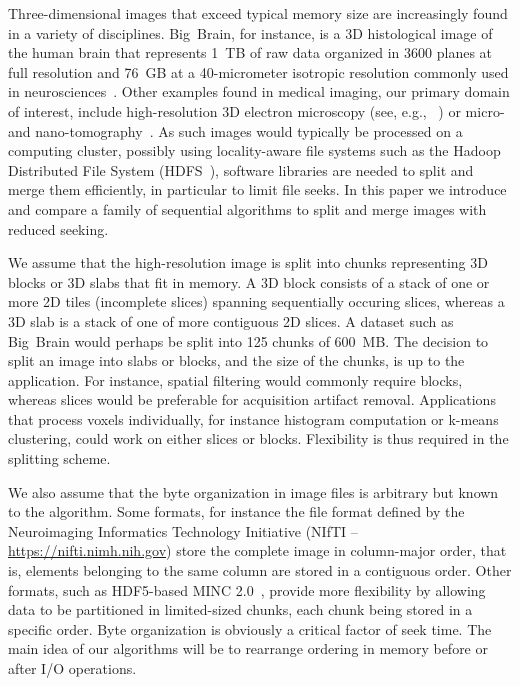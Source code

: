 \documentclass[10pt, conference, compsocconf]{IEEEtran}
\begin{document}
Three-dimensional images that exceed typical memory size are
increasingly found in a variety of disciplines. Big~Brain, for
instance, is a 3D histological image of the human brain that
represents 1~TB of raw data organized in 3600 planes at full
resolution and 76~GB at a 40-micrometer isotropic resolution commonly
used in neurosciences~\cite{amunts2013bigbrain}. Other examples found
in medical imaging, our primary domain of interest, include
high-resolution 3D electron microscopy (see, e.g.,
~\cite{bock2011network}) or micro- and
nano-tomography~\cite{10.1371/journal.pone.0035691}. As such images
would typically be processed on a computing cluster, possibly using
locality-aware file systems such as the Hadoop Distributed File System
(HDFS~\cite{shvachko2010hadoop}), software libraries are needed to
split and merge them efficiently, in particular to limit file
seeks. In this paper we introduce and compare a family of sequential
algorithms to split and merge images with reduced seeking.

We assume that the high-resolution image is split into chunks
representing 3D blocks or 3D slabs that fit in memory. A 3D block
consists of a stack of one or more 2D tiles (incomplete slices) spanning sequentially occuring slices, whereas a 3D slab is 
a stack of one of more contiguous 2D slices. A dataset such
as Big~Brain would perhaps be split into 125 chunks of 600~MB. The
decision to split an image into slabs or blocks, and the size of the
chunks, is up to the application. For instance, spatial filtering would
commonly require blocks, whereas slices would be preferable for acquisition artifact removal. 
Applications that process voxels individually, for instance
histogram computation or k-means clustering, could work on either
slices or blocks. Flexibility is thus required in the splitting
scheme.

We also assume that the byte organization in image files is arbitrary
but known to the algorithm. Some formats, for instance the file format
defined by the Neuroimaging Informatics Technology Initiative (NIfTI
-- \url{https://nifti.nimh.nih.gov}) store the complete image in
column-major order, that is, elements belonging to the same column are
stored in a contiguous order. Other formats, such as HDF5-based MINC
2.0~\cite{vincent2016minc}, provide more flexibility by allowing data
to be partitioned in limited-sized chunks, each chunk being stored in
a specific order. Byte organization is obviously a critical factor of
seek time. The main idea of our algorithms will be to rearrange
ordering in memory before or after I/O operations.
\end{document}
